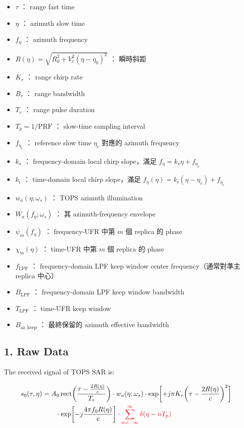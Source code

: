\documentclass[10pt]{article}
\providecommand{\tightlist}{%
  \setlength{\itemsep}{0pt}\setlength{\parskip}{0pt}}
\begin{document}
\begin{itemize}
\tightlist
\item
  \(\tau\) ： range fast time
\item
  \(\eta\) ： azimuth slow time
\item
  \(f_\eta\) ： azimuth frequency
\item
  \(R(\eta)=\sqrt{R_0^2+V_r^2(\eta-\eta_0)^2}\) ： 瞬時斜距
\item
  \(K_r\) ： range chirp rate
\item
  \(B_r\) ： range bandwidth
\item
  \(T_r\) ： range pulse duration
\item
  \(T_p=1/\mathrm{PRF}\) ： slow-time sampling interval
\item
  \(f_{\eta_c}\) ： reference slow time \(\eta_c\) 對應的 azimuth
  frequency
\item
  \(k_s\) ： frequency-domain local chirp slope，滿足
  \(f_\eta = k_s\eta + f_{\eta_c}\)
\item
  \(k_t\) ： time-domain local chirp slope，滿足
  \(f_\eta(\eta)=k_t(\eta-\eta_c)+f_{\eta_c}\)
\item
  \(w_a(\eta;\omega_s)\) ： TOPS azimuth illumination
\item
  \(W_a(f_\eta;\omega_s)\) ： 其 azimuth-frequency envelope
\item
  \(\psi_m(f_\eta)\) ： frequency-UFR 中第 \(m\) 個 replica 的 phase
\item
  \(\chi_m(\eta)\) ： time-UFR 中第 \(m\) 個 replica 的 phase
\item
  \(f_{\mathrm{LPF}}\) ： frequency-domain LPF keep window center
  frequency（通常對準主 replica 中心）
\item
  \(B_{\mathrm{LPF}}\) ： frequency-domain LPF keep window bandwidth
\item
  \(T_{\mathrm{LPF}}\) ： time-UFR keep window
\item
  \(B_{\mathrm{az,keep}}\) ： 最終保留的 azimuth effective bandwidth
\end{itemize}

\hypertarget{raw-data}{%
\subsection{1. Raw Data}\label{raw-data}}

The received signal of TOPS SAR is:

\begin{equation}
\begin{aligned}
s_0(\tau,\eta)
&=
A_0\,
\mathrm{rect}\biggl( \frac{\tau-\frac{2R(\eta)}{c}}{T_r} \biggr)
\cdot w_a(\eta;\omega_s)
\cdot \exp\biggl[ +j\pi K_r\biggl( \tau-\frac{2R(\eta)}{c} \biggr)^2 \biggr]\\
&\qquad \cdot \exp\biggl[ -j\frac{4\pi f_0R(\eta)}{c} \biggr]
\cdot {\color{red}{\sum_{n=-\infty}^{\infty}\delta(\eta-nT_p)}}
\end{aligned}
\end{equation}
\end{document}
